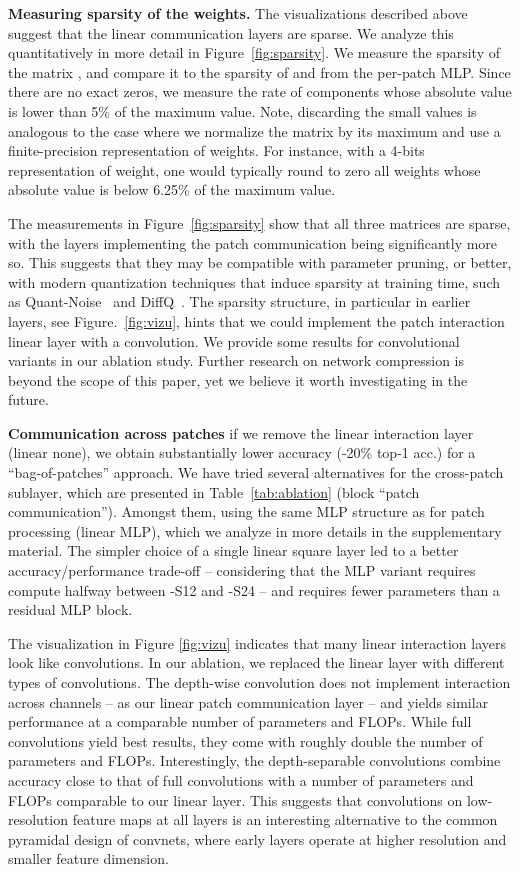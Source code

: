 \textbf{Measuring sparsity of the weights.} 
The visualizations described above suggest that the linear communication layers are sparse. 
We analyze this quantitatively in more detail in Figure~\ref{fig:sparsity}. 
We measure the sparsity of the matrix , and compare it to the sparsity of  and  from the per-patch MLP. 
Since there are no exact zeros, we measure the rate of components whose absolute value is lower than 5\% of the maximum value. 
Note, discarding the small values is analogous to the case where we normalize the matrix by its maximum and use a finite-precision representation of weights. 
For instance, with a 4-bits representation of weight, one would typically round to zero all weights whose absolute value is below 6.25\% of the maximum value. 

The measurements in Figure~\ref{fig:sparsity} show that all three matrices are sparse, with the layers implementing the patch communication being significantly more so. 
This suggests that they may be compatible with parameter pruning, or better, with modern quantization techniques that induce sparsity at training time, such as Quant-Noise~\cite{fan2020training} and DiffQ~\cite{defossez2021differentiable}. 
The sparsity structure, in particular in earlier layers, see Figure.~\ref{fig:vizu}, hints that we could implement the patch interaction linear layer with a convolution. 
We provide some results for convolutional variants in our ablation study. Further research on network compression is beyond the scope of this paper, yet we believe it worth investigating in the future. 

\textbf{Communication across patches } 
if we remove the linear interaction layer (linear  none), we obtain substantially lower accuracy (-20\% top-1 acc.) for a ``bag-of-patches'' approach. 
We have tried several alternatives for the cross-patch sublayer, which are presented in Table~\ref{tab:ablation} (block ``patch communication''). 
Amongst them, using the same MLP structure as for patch processing (linear  MLP), which we analyze in more details in the supplementary material. 
The simpler choice of a single linear square layer led to a better accuracy/performance trade-off -- considering that the MLP variant requires compute halfway between \OURS-S12 and \OURS-S24 -- and requires fewer parameters than a residual MLP block. 

The  visualization in Figure \ref{fig:vizu} indicates that many linear interaction layers look like convolutions. 
In our ablation, we  replaced the linear layer with different types of  convolutions. The depth-wise convolution does not implement interaction across channels  -- as  our linear patch communication layer --  and yields similar performance at a comparable number of parameters and FLOPs.
While  full  convolutions yield best results, they come with roughly double the number of parameters and FLOPs. 
Interestingly, the depth-separable convolutions combine accuracy close to that of full  convolutions with  a  number of parameters and FLOPs comparable to our linear layer. 
This suggests that  convolutions on low-resolution feature maps at all layers is an interesting alternative to the  common pyramidal design of convnets, where early layers operate at higher resolution and smaller feature dimension. 



